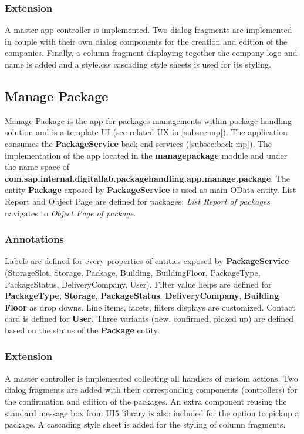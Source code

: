 \subsubsection{Extension}

A master app controller is implemented.
Two dialog fragments are implemented in couple with their own dialog components for the creation and edition of the companies. Finally, a column fragment displaying together the company logo and name is added and a style.css cascading style sheets is used for its styling. 

\subsection{Manage Package}
\label{subsec:dev-ui-mp}

Manage Package is the app for packages managements within package handling solution and is a template UI (see related UX in \autoref{subsec:mp}).
The application consumes the \textbf{PackageService} back-end services (\autoref{subsec:back-mp}).
The implementation of the app
located in the \textbf{managepackage} module and under the name space of
\textbf{com.sap.internal.digitallab.packagehandling.app.manage.package}.
The entity \textbf{Package} exposed by  \textbf{PackageService} is used as main OData entity.
List Report and Object Page are defined for packages: \textit{List Report of packages} navigates to \textit{Object Page of package}.

\subsubsection{Annotations}
Labels are defined for every properties of entities exposed by \textbf{PackageService} (StorageSlot, Storage, Package, Building, BuildingFloor, PackageType, PackageStatus, DeliveryCompany, User). 
Filter value helps are defined for \textbf{PackageType}, \textbf{Storage}, \textbf{PackageStatus}, \textbf{DeliveryCompany}, \textbf{Building Floor} as drop downs.
Line items, facets, filters displays are customized.
Contact card is defined for \textbf{User}.
Three variants (new, confirmed, picked up) are defined based on the status of the \textbf{Package} entity.

\subsubsection{Extension}

A master controller is implemented collecting all handlers of custom actions. Two dialog fragments are added with their corresponding components (controllers) for the confirmation and edition of the packages. An extra component reusing the standard message box from UI5 library is also included for the option to pickup a package. 
A cascading style sheet  is added for the styling of column fragments.


